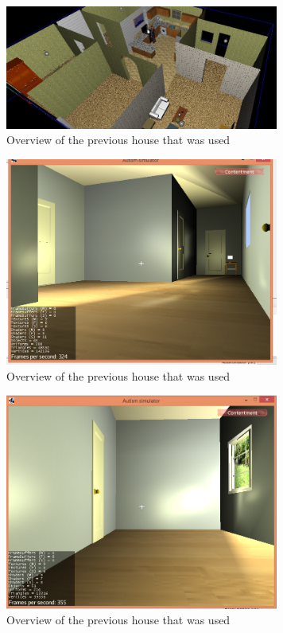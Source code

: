 \documentclass[11pt]{report}
\begin{document}
\begin{figure}[H]
\centering
\includegraphics[width=90mm]{images/old_fullhouse.jpg}
\caption{Overview of the previous house that was used}
\label{old_house}
\end{figure}

\begin{figure}[H]
\centering
\includegraphics[width=90mm]{images/new_hallway1.png}
\caption{Overview of the previous house that was used}
\label{old_house}
\end{figure}

\begin{figure}[H]
\centering
\includegraphics[width=90mm]{images/new_hallway2.png}
\caption{Overview of the previous house that was used}
\label{old_house}
\end{figure}
\end{document}

